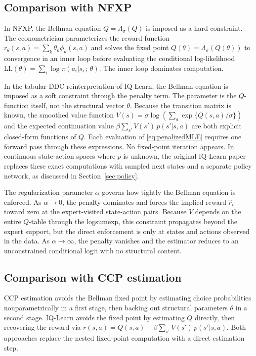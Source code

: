 \documentclass[11pt]{article}
\begin{document}
\subsection{Comparison with NFXP}

In NFXP, the Bellman equation $Q = \Lambda_\sigma(Q)$ is imposed as a hard constraint. The econometrician parameterizes the reward function $r_\theta(s,a) = \sum_k \theta_k \phi_k(s,a)$ and solves the fixed point $Q(\theta) = \Lambda_\sigma(Q(\theta))$ to convergence in an inner loop before evaluating the conditional log-likelihood $\mathrm{LL}(\theta) = \sum_i \log \pi(a_i|s_i\,;\,\theta)$. The inner loop dominates computation.

In the tabular DDC reinterpretation of IQ-Learn, the Bellman equation is imposed as a soft constraint through the penalty term. The parameter is the $Q$-function itself, not the structural vector $\theta$. Because the transition matrix is known, the smoothed value function $V(s) = \sigma\log\left(\sum_a \exp\{Q(s,a)/\sigma\}\right)$ and the expected continuation value $\beta \sum_{s'} V(s')\,p(s'|s,a)$ are both explicit closed-form functions of $Q$. Each evaluation of \eqref{eq:penalizedMLE} requires one forward pass through these expressions. No fixed-point iteration appears. In continuous state-action spaces where $p$ is unknown, the original IQ-Learn paper replaces these exact computations with sampled next states and a separate policy network, as discussed in Section~\ref{sec:policy}.

The regularization parameter $\alpha$ governs how tightly the Bellman equation is enforced. As $\alpha \to 0$, the penalty dominates and forces the implied reward $\hat{r}_i$ toward zero at the expert-visited state-action pairs. Because $V$ depends on the entire $Q$-table through the logsumexp, this constraint propagates beyond the expert support, but the direct enforcement is only at states and actions observed in the data. As $\alpha \to \infty$, the penalty vanishes and the estimator reduces to an unconstrained conditional logit with no structural content.

\subsection{Comparison with CCP estimation}

CCP estimation avoids the Bellman fixed point by estimating choice probabilities nonparametrically in a first stage, then backing out structural parameters $\theta$ in a second stage. IQ-Learn avoids the fixed point by estimating $Q$ directly, then recovering the reward via $r(s,a) = Q(s,a) - \beta \sum_{s'} V(s')\, p(s'|s,a)$. Both approaches replace the nested fixed-point computation with a direct estimation step.
\end{document}
